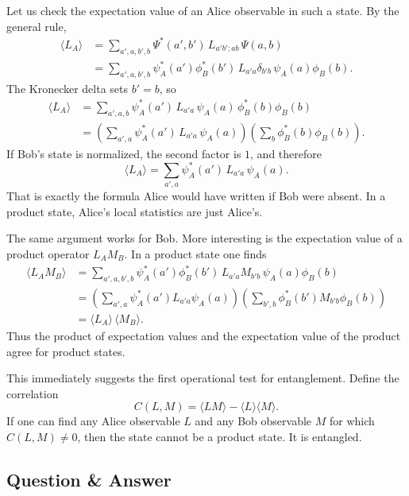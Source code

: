 Let us check the expectation value of an Alice observable in such a state. By the general rule,
\begin{align}
\langle L_A\rangle
&=\sum_{a',a,b',b}\Psi^*(a',b')\,L_{a'b';ab}\,\Psi(a,b) \\
&=\sum_{a',a,b',b}\psi_A^*(a')\phi_B^*(b')\,L_{a'a}\delta_{b'b}\,\psi_A(a)\phi_B(b).
\end{align}
The Kronecker delta sets $b'=b$, so
\begin{align}
\langle L_A\rangle
&=\sum_{a',a,b}\psi_A^*(a')\,L_{a'a}\,\psi_A(a)\,\phi_B^*(b)\phi_B(b) \\
&=\left(\sum_{a',a}\psi_A^*(a')\,L_{a'a}\,\psi_A(a)\right)
\left(\sum_b \phi_B^*(b)\phi_B(b)\right).
\end{align}
If Bob's state is normalized, the second factor is $1$, and therefore
\begin{equation}
\langle L_A\rangle=\sum_{a',a}\psi_A^*(a')\,L_{a'a}\,\psi_A(a).
\end{equation}
That is exactly the formula Alice would have written if Bob were absent. In a product state, Alice's local statistics are just Alice's.

The same argument works for Bob. More interesting is the expectation value of a product operator $L_A M_B$. In a product state one finds
\begin{align}
\langle L_A M_B\rangle
&=\sum_{a',a,b',b}
\psi_A^*(a')\phi_B^*(b')\,L_{a'a}M_{b'b}\,\psi_A(a)\phi_B(b) \\
&=\left(\sum_{a',a}\psi_A^*(a')L_{a'a}\psi_A(a)\right)
\left(\sum_{b',b}\phi_B^*(b')M_{b'b}\phi_B(b)\right) \\
&=\langle L_A\rangle\,\langle M_B\rangle.
\end{align}
Thus the product of expectation values and the expectation value of the product agree for product states.

This immediately suggests the first operational test for entanglement. Define the correlation
\begin{equation}
C(L,M)=\langle LM\rangle-\langle L\rangle\langle M\rangle.
\end{equation}
If one can find any Alice observable $L$ and any Bob observable $M$ for which $C(L,M)\neq 0$, then the state cannot be a product state. It is entangled.

\subsection{Question \& Answer}

